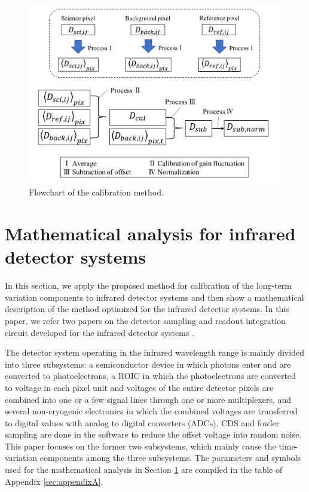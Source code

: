 \documentclass{aastex62}
\begin{document}
\begin{figure}[H]
\begin{center}
\includegraphics[width=12cm]{calibration_flowchart.pdf}
\caption{Flowchart of the calibration method. \label{fig:calibration_flowchart}}
\end{center}
\end{figure}


\section{Mathematical analysis for infrared detector systems} \label{sec:analysis}

In this section, we apply the proposed method for calibration of the long-term variation components to infrared detector systems and then show a mathematical description of the method optimized for the infrared detector systems.
In this paper, we refer two papers on the detector sampling and readout integration circuit developed for the infrared detector systems \citep{2009ITED...56.2506J, 2015PASP..127..675R}.

The detector system operating in the infrared wavelength range is mainly divided into three subsystems: a semiconductor device in which photons enter and are converted to photoelectrons, a ROIC in which the photoelectrons are converted to voltage in each pixel unit and voltages of the entire detector pixels are combined into one or a few signal lines through one or more multiplexers, and several non-cryogenic electronics in which the combined voltages are transferred to digital values with analog to digital converters (ADCs). CDS and fowler sampling are done in the software to reduce the offset voltage into random noise. This paper focuses on the former two subsystems, which mainly cause the time-variation components among the three subsystems. The parameters and symbols used for the mathematical analysis in Section \ref{sec:analysis} are compiled in the table of Appendix \ref{sec:appendixA}.
\end{document}
